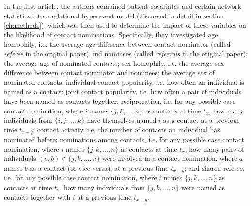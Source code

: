 In the first article, the authors combined patient covariates and certain network statistics into a relational hyperevent model (discussed in detail in section \ref{ch:methods}), which was then used to determine the impact of these variables on the likelihood of contact nominations. Specifically, they investigated age homophily, i.e. the average age difference between contact nominator (called \emph{referee} in the original paper) and nominees (called \emph{referrals} in the original paper); the average age of nominated contacts; sex homophily, i.e. the average sex difference between contact nominator and nominees; the average sex of nominated contacts; individual contact popularity, i.e. how often an individual is named as a contact; joint contact popularity, i.e. how often a pair of individuals have been named as contacts together; reciprocation, i.e. for any possible case contact nomination, where $i$ names $\{j,k,...,n\}$ as contacts at time $t_x$, how many individuals from $\{i,j,...,k\}$ have themselves named $i$ as a contact at a previous time $t_{x-y}$; contact activity, i.e. the number of contacts an individual has nominated before; nominations among contacts, i.e. for any possible case contact nomination, where $i$ names $\{j,k,...,n\}$ as contacts at time $t_x$, how many pairs of individuals $(a,b) \in \{j,k,...,n\}$ were involved in a contact nomination, where $a$ names $b$ as a contact (or vice versa), at a previous time $t_{x-y}$; and shared referee, i.e. for any possible case contact nomination, where $i$ names $\{j,k,...,n\}$ as contacts at time $t_x$, how many individuals from $\{j,k,...,n\}$ were named as contacts together with $i$ at a previous time $t_{x-y}$.

